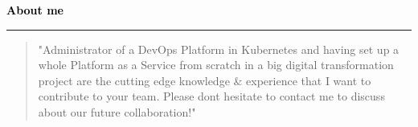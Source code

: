\documentclass[10pt,A4]{article}
\begin{document}
%
\textcolor{black}{\large \bf About me\\}
\noindent\textcolor{blue!10}{\rule{\textwidth}{.8mm}}
\begin{quotation}
"Administrator of a DevOps Platform in Kubernetes and having set up a whole Platform as a Service from scratch in a big digital transformation project are the cutting edge knowledge \& experience that I want to contribute to your team. 
Please dont hesitate to contact me to discuss about our future collaboration!"
\end{quotation}
\begin{minipage}[c]{0.7\textwidth}
%

\end{minipage}
\end{document}
